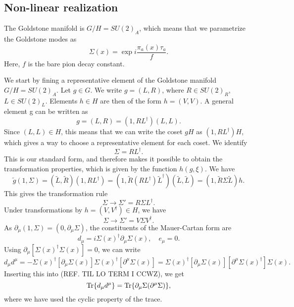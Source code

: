 \subsection*{Non-linear realization}
The Goldstone manifold is $G/H = SU(2)_A$, which means that we parametrize the Goldstone modes as
\begin{equation}
    \Sigma(x) = \exp{i \frac{\pi_a(x) \tau_a}{f} }.
\end{equation}
Here, $f$ is the bare pion decay constant.

We start by fining a representative element of the Goldstone manifold $G/H = SU(2)_A$.
Let $g\in G$. 
We write $g = (L, R)$, where $R \in SU(2)_R$, $L \in SU(2)_L$.
Elements $h \in H$ are then of the form $h = (V, V)$.
A general element g can be written as
\begin{equation}
    g = (L, R) = (1, R L^\dagger) (L, L).
\end{equation}
Since $(L, L) \in H$, this means that we can write the coset $g H$ as $(1, R L^\dagger)H$, which gives a way to choose a representative element for each coset.
We identify
\begin{equation}
    \Sigma = R L^\dagger. 
\end{equation}
This is our standard form, and therefore makes it possible to obtain the transformation properties, which is given by the function $h(g, \xi)$.
We have 
\begin{equation}
    \tilde g (1, \Sigma)
    = (\tilde L, \tilde R) (1, R L^\dagger)
    = (1, \tilde R (R L^\dagger) \tilde L^\dagger) (\tilde L, \tilde L)
    = (1, \tilde R \Sigma \tilde L) h.
\end{equation}
This gives the transformation rule
\begin{equation}
    \Sigma \rightarrow \Sigma' = R \Sigma L^\dagger.
\end{equation}
Under transformations by $h = (V, V^\dagger) \in H$, we have
\begin{equation}
    \Sigma \rightarrow \Sigma' = V \Sigma V^\dagger.
\end{equation}
As $\partial_\mu  (1, \Sigma) = (0, \partial_\mu \Sigma)$, the constituents of the Mauer-Cartan form are
\begin{equation}
    d_\mu = i \Sigma(x)^\dagger \partial_\mu \Sigma(x),\quad
    e_\mu = 0.
\end{equation}
Using $\partial_\mu [\Sigma(x)^\dagger\Sigma(x)] = 0 $, we can write
\begin{equation}
    d_\mu d^\mu = 
    - \Sigma(x)^\dagger [\partial_\mu \Sigma(x)] \Sigma(x)^\dagger [\partial^\mu \Sigma(x)]
    =\Sigma(x)^\dagger [\partial_\mu \Sigma(x)] [\partial^\mu \Sigma(x)^\dagger] \Sigma(x).
\end{equation}
Inserting this into (REF. TIL LO TERM I CCWZ), we get
\begin{equation}
    \Tr{d_\mu d^\mu} = \Tr{\partial_\mu \Sigma (\partial^\mu \Sigma)},
\end{equation}
where we have used the cyclic property of the trace.


